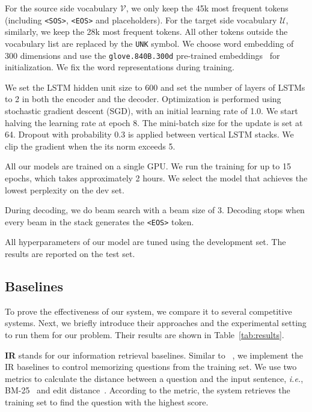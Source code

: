 \documentclass[11pt,a4paper]{article}
\newcommand{\ie}{{\em i.e.}}
\begin{document}
For the source side vocabulary $\mathcal{V}$, we only keep the 45k most frequent tokens (including \verb|<SOS>|, \verb|<EOS>| and placeholders). For the target side vocabulary $\mathcal{U}$, similarly, we keep the 28k most frequent tokens. All other tokens outside the vocabulary list are replaced by the \verb|UNK| symbol. We choose word embedding of 300 dimensions and use the \verb|glove.840B.300d| pre-trained embeddings~\cite{pennington2014glove} for initialization. We fix the word representations during training.

We set the LSTM hidden unit size to 600 and set the number of layers of LSTMs to 2 in both the encoder and the decoder. Optimization is performed using stochastic gradient descent (SGD), with an initial learning rate of 1.0. We start halving the learning rate at epoch 8. The mini-batch size for the update is set at 64. Dropout with probability 0.3 is applied between vertical LSTM stacks. We clip the gradient when the its norm exceeds 5.

All our models are trained on a single GPU. We run the training for up to 15 epochs, which takes approximately 2 hours. We select the model that achieves the lowest perplexity on the dev set.

During decoding, we do beam search with a beam size of 3. Decoding stops when every beam in the stack generates the \verb|<EOS>| token.


All hyperparameters of our model are tuned using the development set. The results are reported on the test set. 



\subsection{Baselines}
\label{ssec:baselines}

To prove the effectiveness of our system, we compare it to several competitive systems. Next, we briefly introduce their approaches and the experimental setting to run them for our problem. Their results are shown in Table~\ref{tab:results}.

\vspace{0.1cm} \noindent \textbf{IR} stands for our information retrieval baselines. Similar to ~, we implement the IR baselines to control memorizing questions from the training set. We use two metrics to calculate the distance between a question and the input sentence, \ie, BM-25~\cite{robertson1994bm25} and edit distance~\cite{levenshtein1966binary}. According to the metric, the system retrieves the training set to find the question with the highest score.
\end{document}
